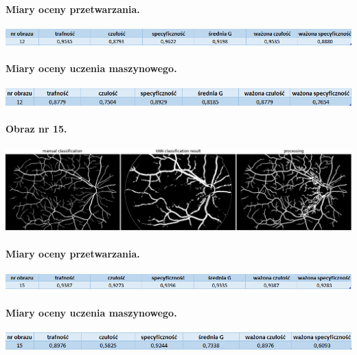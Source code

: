 \documentclass[a4paper, 11pt]{article}
\begin{document}
\paragraph{Miary oceny przetwarzania.}
\begin{center}
	\includegraphics[width=\textwidth]{./processing/data12.png}
\end{center}

\paragraph{Miary oceny uczenia maszynowego.}
\begin{center}
	\includegraphics[width=\textwidth]{./ML/data12.png}
\end{center}

\paragraph{Obraz nr 15.}

\begin{center}
	
	\includegraphics[width=\textwidth]{./15_h.png}
	
\end{center}

\paragraph{Miary oceny przetwarzania.}
\begin{center}
	\includegraphics[width=\textwidth]{./processing/data15.png}
\end{center}

\paragraph{Miary oceny uczenia maszynowego.}
\begin{center}
	\includegraphics[width=\textwidth]{./ML/data15.png}
\end{center}
\end{document}
